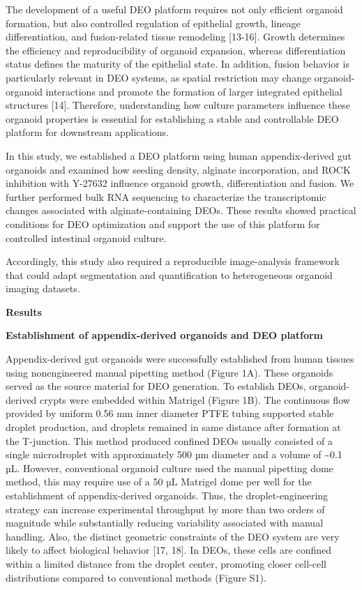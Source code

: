\documentclass[
]{article}
\begin{document}
The development of a useful DEO platform requires not only efficient organoid formation, but also controlled regulation of epithelial growth, lineage differentiation, and fusion-related tissue remodeling {[}13-16{]}. Growth determines the efficiency and reproducibility of organoid expansion, whereas differentiation status defines the maturity of the epithelial state. In addition, fusion behavior is particularly relevant in DEO systems, as spatial restriction may change organoid-organoid interactions and promote the formation of larger integrated epithelial structures {[}14{]}. Therefore, understanding how culture parameters influence these organoid properties is essential for establishing a stable and controllable DEO platform for downstream applications.

In this study, we established a DEO platform using human appendix-derived gut organoids and examined how seeding density, alginate incorporation, and ROCK inhibition with Y-27632 influence organoid growth, differentiation and fusion. We further performed bulk RNA sequencing to characterize the transcriptomic changes associated with alginate-containing DEOs. These results showed practical conditions for DEO optimization and support the use of this platform for controlled intestinal organoid culture.

Accordingly, this study also required a reproducible image-analysis framework that could adapt segmentation and quantification to heterogeneous organoid imaging datasets.

\textbf{Results}

\textbf{Establishment of appendix-derived organoids and DEO platform}

Appendix-derived gut organoids were successfully established from human tissues using nonengineered manual pipetting method (Figure 1A). These organoids served as the source material for DEO generation. To establish DEOs, organoid-derived crypts were embedded within Matrigel (Figure 1B). The continuous flow provided by uniform 0.56 mm inner diameter PTFE tubing supported stable droplet production, and droplets remained in same distance after formation at the T-junction. This method produced confined DEOs usually consisted of a single microdroplet with approximately 500 µm diameter and a volume of \textasciitilde0.1 µL. However, conventional organoid culture used the manual pipetting dome method, this may require use of a 50 µL Matrigel dome per well for the establishment of appendix-derived organoids. Thus, the droplet-engineering strategy can increase experimental throughput by more than two orders of magnitude while substantially reducing variability associated with manual handling. Also, the distinct geometric constraints of the DEO system are very likely to affect biological behavior {[}17, 18{]}. In DEOs, these cells are confined within a limited distance from the droplet center, promoting closer cell-cell distributions compared to conventional methods (Figure S1).
\end{document}
